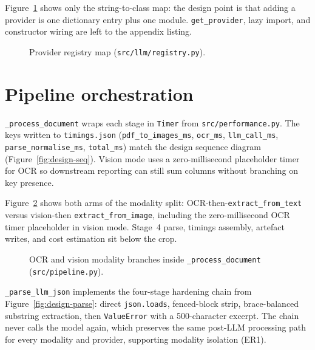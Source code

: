 Figure~\ref{fig:impl-registry} shows only the string-to-class map: the
design point is that adding a provider is one dictionary entry plus
one module. \texttt{get\_provider}, lazy import, and constructor wiring
are left to the appendix listing.

\begin{figure}[ht]
    \centering
    \caption{Provider registry map (\texttt{src/llm/registry.py}).}
    \label{fig:impl-registry}
\end{figure}


\section{Pipeline orchestration}
\label{sec:impl-pipeline}

\texttt{\_process\_document} wraps each stage in
\texttt{Timer} from \texttt{src/performance.py}. The keys written to
\texttt{timings.json} (\texttt{pdf\_to\_images\_ms},
\texttt{ocr\_ms}, \texttt{llm\_call\_ms},
\texttt{parse\_normalise\_ms}, \texttt{total\_ms}) match the design
sequence diagram (Figure~\ref{fig:design-seq}). Vision mode uses a
zero-millisecond placeholder timer for OCR so downstream reporting
can still sum columns without branching on key presence.

Figure~\ref{fig:impl-pipeline-core} shows both arms of the modality
split: OCR-then-\texttt{extract\_from\_text} versus vision-then
\texttt{extract\_from\_image}, including the zero-millisecond OCR timer
placeholder in vision mode. Stage~4 parse, timings assembly, artefact
writes, and cost estimation sit below the crop.

\begin{figure}[ht]
    \centering
    \caption{OCR and vision modality branches inside
    \texttt{\_process\_document} (\texttt{src/pipeline.py}).}
    \label{fig:impl-pipeline-core}
\end{figure}

\texttt{\_parse\_llm\_json} implements the four-stage hardening
chain from Figure~\ref{fig:design-parse}: direct
\texttt{json.loads}, fenced-block strip, brace-balanced substring
extraction, then \texttt{ValueError} with a 500-character excerpt.
The chain never calls the model again, which preserves the same
post-LLM processing path for every modality and provider, supporting
modality isolation (ER1).

